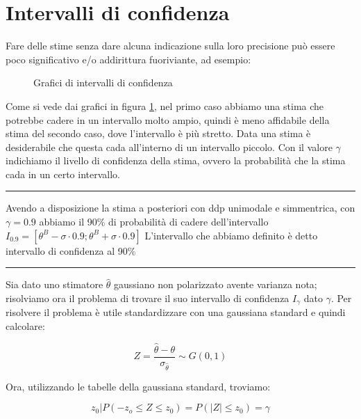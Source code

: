 \section{Intervalli di confidenza}
Fare delle stime senza dare alcuna indicazione sulla loro precisione può essere poco significativo e/o addirittura fuoriviante, ad esempio:

  \begin{figure}[htbp]
    \centering
    \caption{Grafici di intervalli di confidenza \label{fig:grafIntConf}}
  \end{figure}
Come si vede dai grafici in figura \ref{fig:grafIntConf}, nel primo caso abbiamo una stima che potrebbe cadere in un intervallo molto ampio, quindi è meno affidabile della stima del secondo caso, dove l'intervallo è più stretto.\newline
Data una stima è desiderabile che questa cada all'interno di un intervallo piccolo. Con il valore $\gamma$ indichiamo il livello di confidenza della stima, ovvero la probabilità che la stima cada in un certo intervallo.

\begin{center} \rule{300pt}{1pt} \end{center}
\begin{esempio} %
Avendo a disposizione la stima a posteriori con ddp unimodale e simmentrica, con $\gamma=0.9$ abbiamo il 90\% di probabilità di cadere dell'intervallo $I_{0.9}=[\theta^B-\sigma \cdot 0.9 ; \theta^B + \sigma \cdot 0.9]$ \newline
[grafico]\newline
L'intervallo che abbiamo definito è detto intervallo di confidenza al 90\%
\end{esempio}
\begin{center} \rule{300pt}{1pt} \end{center}

Sia dato uno stimatore $\hat{\theta}$ gaussiano non polarizzato avente varianza nota; risolviamo ora il problema di trovare il suo intervallo di confidenza $I_\gamma$ dato $\gamma$. Per risolvere il problema è utile standardizzare con una gaussiana standard e quindi calcolare:

  \[ Z=\frac{\hat{\theta}-\theta}{\sigma_{\hat{\theta}}}\sim G(0,1) \]
  
Ora, utilizzando le tabelle della gaussiana standard, troviamo:

  \[  z_0 | P(-z_o \leq Z \leq z_0)=P(\left| Z \right| \leq z_0 )=\gamma \]
  
